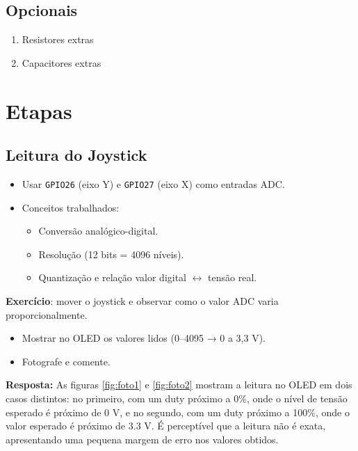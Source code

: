 \documentclass{article}
\begin{document}
\subsection{Opcionais}

\begin{enumerate}
    \item Resistores extras
    \item Capacitores extras
\end{enumerate}

\section{Etapas}

\subsection{Leitura do Joystick}

\begin{itemize}
    \item Usar \texttt{GPIO26} (eixo Y) e \texttt{GPIO27} (eixo X) como entradas ADC.
    \item Conceitos trabalhados:
    \begin{itemize}
        \item Conversão analógico-digital.
        \item Resolução (12 bits = 4096 níveis).
        \item Quantização e relação valor digital $\leftrightarrow$ tensão real.
    \end{itemize}
\end{itemize}

\noindent
\textbf{Exercício}: mover o joystick e observar como o valor ADC varia proporcionalmente.

\begin{itemize}
    \item Mostrar no OLED os valores lidos (0–4095 → 0 a 3,3 V).
    \item Fotografe e comente.
\end{itemize}

\noindent
\textbf{Resposta:} As figuras \ref{fig:foto1} e \ref{fig:foto2} mostram a leitura no OLED em dois casos distintos: no primeiro, com um duty próximo a 0\%, onde o nível de tensão esperado é próximo de 0 V, e no segundo, com um duty próximo a 100\%, onde o valor esperado é próximo de 3.3 V. É perceptível que a leitura não é exata, apresentando uma pequena margem de erro nos valores obtidos.
\end{document}
